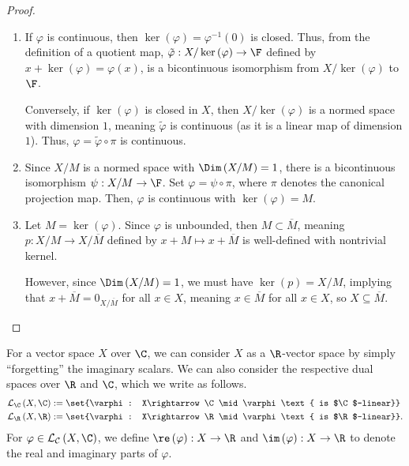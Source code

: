 \documentclass[10pt]{mypackage}
\begin{document}
  \begin{proof}\hfill
    \begin{enumerate}[(1)]
      \item If $\varphi$ is continuous, then $\ker\left(\varphi\right) = \varphi^{-1}\left(0\right)$ is closed. Thus, from the definition of a quotient map, $\tilde{\varphi}: X/\ker\left(\varphi\right) \rightarrow \F$ defined by $x + \ker\left(\varphi\right) = \varphi(x)$, is a bicontinuous isomorphism from $X/\ker\left(\varphi\right)$ to $\F$.\newline

        Conversely, if $\ker\left(\varphi\right)$ is closed in $X$, then $X/\ker\left(\varphi\right)$ is a normed space with dimension $1$, meaning $\tilde{\varphi}$ is continuous (as it is a linear map of dimension $1$). Thus, $\varphi = \tilde{\varphi}\circ \pi$ is continuous.
      \item Since $X/M$ is a normed space with $\Dim\left(X/M\right) = 1$, there is a bicontinuous isomorphism $\psi: X/M\rightarrow \F$. Set $\varphi = \psi\circ\pi$, where $\pi$ denotes the canonical projection map. Then, $\varphi$ is continuous with $\ker\left(\varphi\right) = M$.
      \item Let $M = \ker\left(\varphi\right)$. Since $\varphi$ is unbounded, then $M\subset \overline{M}$, meaning $p: X/M\rightarrow X/\overline{M}$ defined by $x+M \mapsto x + \overline{M}$ is well-defined with nontrivial kernel.\newline

        However, since $\Dim\left(X/M\right) = 1$, we must have $\ker\left(p\right) = X/M$, implying that $x+\overline{M} = 0_{X/\overline{M}}$ for all $x\in X$, meaning $x\in \overline{M}$ for all $x\in X$, so $X\subseteq \overline{M}$.
    \end{enumerate}
  \end{proof}
  For a vector space $X$ over $\C$, we can consider $X$ as a $\R$-vector space by simply ``forgetting'' the imaginary scalars. We can also consider the respective dual spaces over $\R$ and $\C$, which we write as follows.
  \begin{align*}
    \mathcal{L}_{\C}\left(X,\C\right) &:= \set{\varphi: X\rightarrow \C\mid \varphi\text{ is $\C$-linear}}\\
    \mathcal{L}_{\R}\left(X,\R\right) &:= \set{\varphi: X\rightarrow \R\mid\varphi\text{ is $\R$-linear}}.
  \end{align*}
  For $\varphi\in \mathcal{L}_{\mathcal{C}}\left(X,\C\right)$, we define $\re\left(\varphi\right): X\rightarrow \R$ and $\im\left(\varphi\right): X\rightarrow \R$ to denote the real and imaginary parts of $\varphi$.
\end{document}
